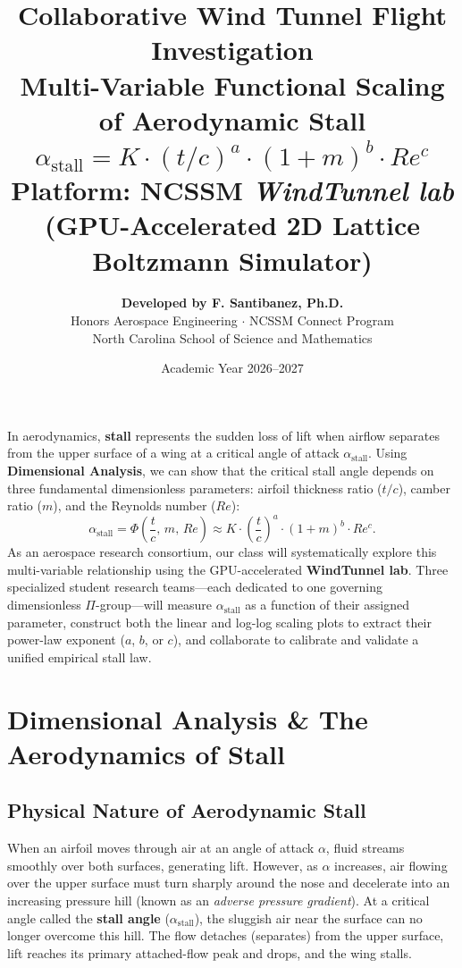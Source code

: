 \documentclass[11pt,a4paper]{article}
\title{\vspace{-1.0cm}\textbf{\huge Collaborative Wind Tunnel Flight Investigation} \\[0.3cm]
\Large Multi-Variable Functional Scaling of Aerodynamic Stall \\[0.2cm]
\large $\alpha_{\text{stall}} = K \cdot (t/c)^a \cdot (1+m)^b \cdot Re^c$ \\
\vspace{0.3cm}
\normalsize \textbf{Platform:} NCSSM \textit{WindTunnel lab} (GPU-Accelerated 2D Lattice Boltzmann Simulator)}
\author{\textbf{Developed by F. Santibanez, Ph.D.} \\
Honors Aerospace Engineering $\cdot$ NCSSM Connect Program \\
North Carolina School of Science and Mathematics}
\date{Academic Year 2026--2027}
\begin{document}
\maketitle

\begin{tcolorbox}[title=Mission Briefing \& Research Objective, colframe=blue!60!black]
In aerodynamics, \textbf{stall} represents the sudden loss of lift when airflow separates from the upper surface of a wing at a critical angle of attack $\alpha_{\text{stall}}$. Using \textbf{Dimensional Analysis}, we can show that the critical stall angle depends on three fundamental dimensionless parameters: airfoil thickness ratio ($t/c$), camber ratio ($m$), and the Reynolds number ($Re$):
\begin{equation}
\alpha_{\text{stall}} = \Phi\left(\frac{t}{c},\, m,\, Re\right) \approx K \cdot \left(\frac{t}{c}\right)^a \cdot \left(1 + m\right)^b \cdot Re^c.
\end{equation}
As an aerospace research consortium, our class will systematically explore this multi-variable relationship using the GPU-accelerated \textbf{WindTunnel lab}. Three specialized student research teams---each dedicated to one governing dimensionless $\Pi$-group---will measure $\alpha_{\text{stall}}$ as a function of their assigned parameter, construct both the linear and log-log scaling plots to extract their power-law exponent ($a$, $b$, or $c$), and collaborate to calibrate and validate a unified empirical stall law.
\end{tcolorbox}

\section{Dimensional Analysis \& The Aerodynamics of Stall}

\subsection{Physical Nature of Aerodynamic Stall}
When an airfoil moves through air at an angle of attack $\alpha$, fluid streams smoothly over both surfaces, generating lift. However, as $\alpha$ increases, air flowing over the upper surface must turn sharply around the nose and decelerate into an increasing pressure hill (known as an \textit{adverse pressure gradient}). At a critical angle called the \textbf{stall angle} ($\alpha_{\text{stall}}$), the sluggish air near the surface can no longer overcome this hill. The flow detaches (separates) from the upper surface, lift reaches its primary attached-flow peak and drops, and the wing stalls.
\end{document}
